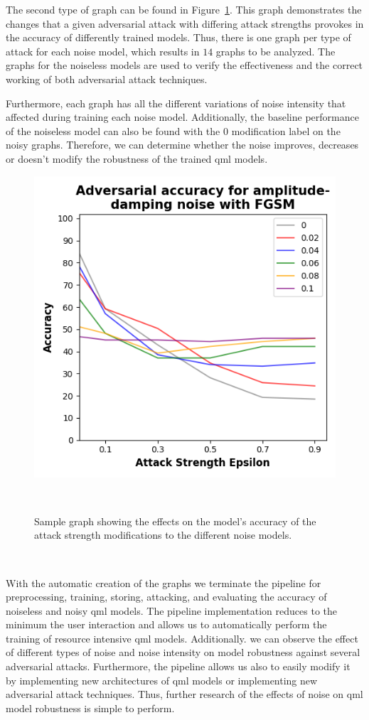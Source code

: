 The second type of graph can be found in Figure~\ref{fig:sample-adversarial}.
This graph demonstrates the changes that a given adversarial attack with
differing attack strengths provokes in the accuracy of differently trained
models. Thus, there is one graph per type of attack for each noise model,
which results in \(14\) graphs to be analyzed. The graphs for the
noiseless models are used to verify the effectiveness and the
correct working of both adversarial attack techniques. \

Furthermore, each graph has all the different variations of noise intensity
that affected during training each noise model. Additionally, the baseline
performance of the noiseless model can also be found with the \(0\) modification
label on the noisy graphs. Therefore, we can determine whether the noise
improves, decreases or doesn't modify the robustness of the trained \ac{qml}
models. \

\begin{figure}[h!]
  \includegraphics[scale=0.70]{figures/adversarial-graph.png}
  \centering
  \caption{Sample graph showing the effects on the model's accuracy of the attack strength modifications to the different noise models.}
~\label{fig:sample-adversarial}
\end{figure} \

With the automatic creation of the graphs we terminate the pipeline
for preprocessing, training, storing, attacking, and evaluating the
accuracy of noiseless and noisy \ac{qml} models. The pipeline implementation
reduces to the minimum the user interaction and allows us to automatically
perform the training of resource intensive \ac{qml} models. Additionally.
we can observe the effect of different types of noise and noise intensity
on model robustness against several adversarial attacks. Furthermore,
the pipeline allows us also to easily modify it by implementing new
architectures of \ac{qml} models or implementing new adversarial attack
techniques. Thus, further research of the effects of noise on \ac{qml}
model robustness is simple to perform. \
